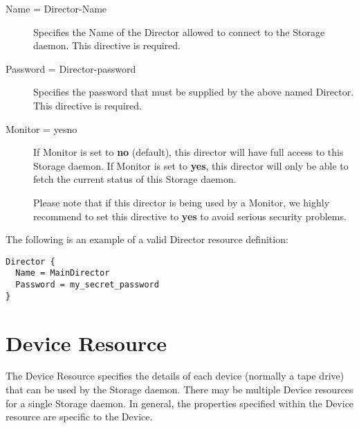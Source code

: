 \begin{description}

\item [Name = \lt{}Director-Name\gt{}]
   Specifies the Name of the Director allowed to connect  to the Storage daemon.
   This directive is required.  

\item [Password = \lt{}Director-password\gt{}]
   Specifies the password that must be supplied by the above named  Director.
   This directive is required.  

\item [Monitor = \lt{}yes\vb{}no\gt{}]
   If Monitor is set to {\bf no} (default), this director will have full
   access to this Storage daemon.  If Monitor is set to {\bf yes}, this
   director will only be able to fetch the current status of this Storage
   daemon.

   Please note that if this director is being used by a Monitor, we highly 
   recommend to set this directive to {\bf yes} to avoid serious security 
   problems. 

\end{description}

The following is an example of a valid Director resource definition: 

\footnotesize
\begin{verbatim}
Director {
  Name = MainDirector
  Password = my_secret_password
}
\end{verbatim}
\normalsize

\label{DeviceResource}
\section{Device Resource}

The Device Resource specifies the details of each device (normally a tape
drive) that can be used by the Storage daemon.  There may be multiple
Device resources for a single Storage daemon.  In general, the properties
specified within the Device resource are specific to the Device.

